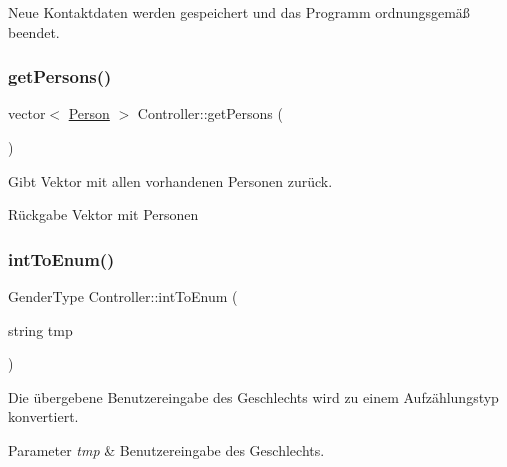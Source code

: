Neue Kontaktdaten werden gespeichert und das Programm ordnungsgemäß beendet.

\mbox{\label{classContactManager_1_1Controller_a487e6797ca3e968830fea9e0cd8d8faa}} 
\subsubsection{\texorpdfstring{get\+Persons()}{getPersons()}}
{\footnotesize\ttfamily vector$<$ \hyperlink{classContactManager_1_1Person}{Person} $>$ Controller\+::get\+Persons (\begin{DoxyParamCaption}{ }\end{DoxyParamCaption})}



Gibt Vektor mit allen vorhandenen Personen zurück.

\begin{DoxyReturn}{Rückgabe}
Vektor mit Personen 
\end{DoxyReturn}
\mbox{\label{classContactManager_1_1Controller_ac4295728664d4137e39478cd3e30e0fd}} 
\subsubsection{\texorpdfstring{int\+To\+Enum()}{intToEnum()}}
{\footnotesize\ttfamily Gender\+Type Controller\+::int\+To\+Enum (\begin{DoxyParamCaption}\item[{string}]{tmp }\end{DoxyParamCaption})\hspace{0.3cm}{\ttfamily [static]}}



Die übergebene Benutzereingabe des Geschlechts wird zu einem Aufzählungstyp konvertiert.


\begin{DoxyParams}{Parameter}
{\em tmp} & Benutzereingabe des Geschlechts.\\
\hline
\end{DoxyParams}
\mbox{\label{classContactManager_1_1Controller_a5b020c2e4726dc2e50fc14b4ac53b3d9}} 
